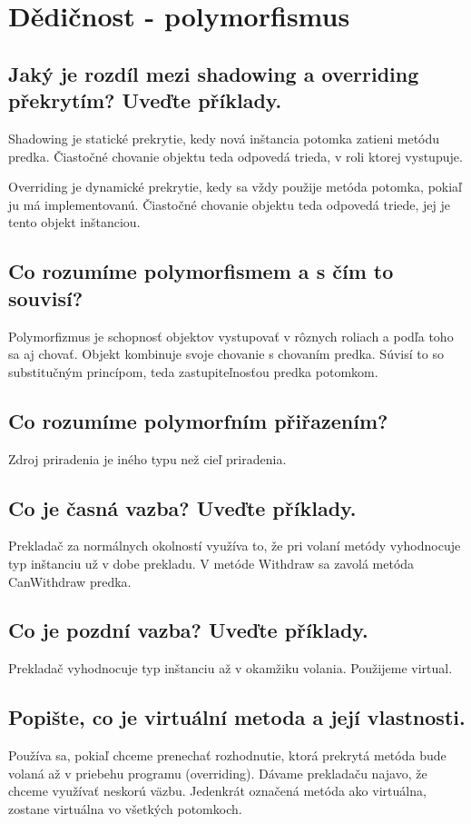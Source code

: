\section{Dědičnost - polymorfismus}
\subsection{Jaký je rozdíl mezi shadowing a overriding překrytím? Uveďte příklady.}
Shadowing je statické prekrytie, kedy nová inštancia potomka zatieni metódu predka. Čiastočné chovanie objektu teda odpovedá trieda, v roli ktorej vystupuje.

Overriding je dynamické prekrytie, kedy sa vždy použije metóda potomka, pokiaľ ju má implementovanú. Čiastočné chovanie objektu teda odpovedá triede, jej je tento objekt inštanciou.

\subsection{Co rozumíme polymorfismem a s čím to souvisí?}
Polymorfizmus je schopnosť objektov vystupovať v rôznych roliach a podľa toho sa aj chovať. Objekt kombinuje svoje chovanie s chovaním predka. Súvisí to so substitučným princípom, teda zastupiteľnosťou predka potomkom.

\subsection{Co rozumíme polymorfním přiřazením?}
Zdroj priradenia je iného typu než cieľ priradenia.

\subsection{Co je časná vazba? Uveďte příklady.}
Prekladač za normálnych okolností využíva to, že pri volaní metódy vyhodnocuje typ inštanciu už v dobe prekladu. V metóde Withdraw sa zavolá metóda CanWithdraw predka.

\subsection{Co je pozdní vazba? Uveďte příklady.}
Prekladač vyhodnocuje typ inštanciu až v okamžiku volania. Použijeme virtual.


\subsection{Popište, co je virtuální metoda a její vlastnosti.}
Používa sa, pokiaľ chceme prenechať rozhodnutie, ktorá prekrytá metóda bude volaná až v priebehu programu (overriding). Dávame prekladaču najavo, že chceme využívať neskorú väzbu. Jedenkrát označená metóda ako virtuálna, zostane virtuálna vo všetkých potomkoch.

